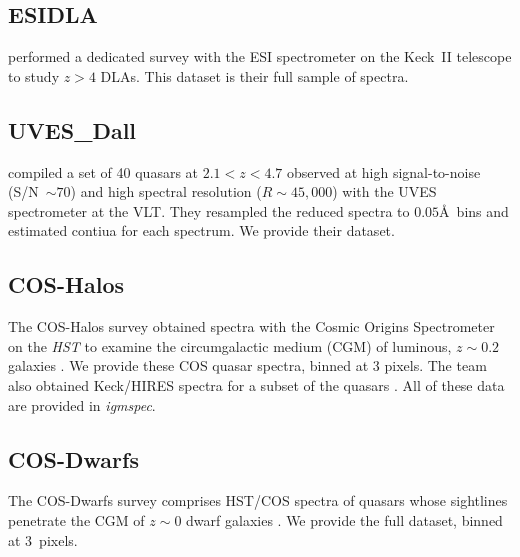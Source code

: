\documentclass[12pt]{elsarticle}
\begin{document}
\subsection{ESIDLA}
\label{sec:esidla}

\cite{rafelski+12,rafelski+14} performed a dedicated survey
with the ESI spectrometer \citep{sbe+02} on the Keck~II telescope
to study $z>4$ DLAs.  This dataset is their
full sample of spectra.

\subsection{UVES\_Dall}
\cite{dallaglio+08} compiled a set of 40 quasars at $2.1 < z < 4.7$ observed
at high signal-to-noise (S/N~$\sim 70$) and high spectral resolution ($R\sim 45,000$)
with the UVES spectrometer \citep{uves} at the VLT.  They resampled the reduced spectra to
$0.05$\AA\ bins and estimated contiua for each spectrum.  We provide their dataset.

\subsection{COS-Halos}
\label{sec:cos-halos}

The COS-Halos survey obtained spectra with the
Cosmic Origins Spectrometer 
\citep[COS;][]{cos} on the {\it HST}
to examine the circumgalactic medium (CGM) of luminous,
$z \sim 0.2$ galaxies \citep{tumlinson+13}.
We provide these COS quasar spectra, binned at 3 pixels.
The team also obtained Keck/HIRES spectra for a subset of the
quasars \citep{werk+13}.
All of these data are provided in {\it igmspec}.

\subsection{COS-Dwarfs}
\label{sec:cos-dwarfs}

The COS-Dwarfs survey comprises HST/COS spectra
of quasars whose sightlines penetrate the CGM of
$z \sim 0$ dwarf galaxies \citep{bordoloi14}.
We provide the full dataset, binned at 3~pixels.

%
\end{document}
